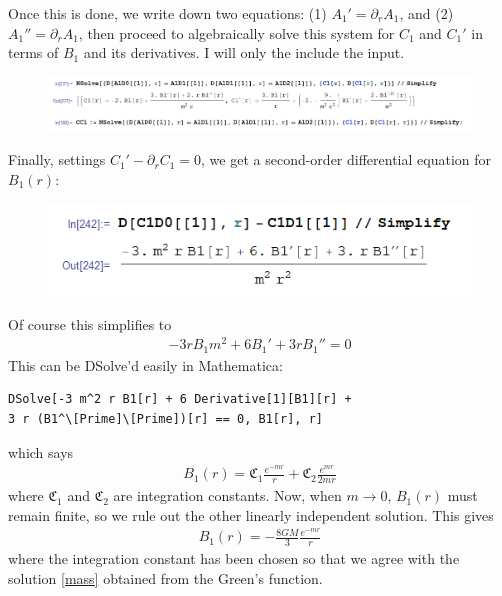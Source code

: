 \documentclass{book}
\theoremstyle{definition}
\newcommand{\p}{\partial}
\newcommand{\f}[2]{\frac{#1}{#2}}
\begin{document}
Once this is done, we write down two equations: (1) $A_1' = \p_r A_1$, and (2) $A_1''=\p_r A_1$, then proceed to algebraically solve this system for $C_1$ and $C_1'$ in terms of $B_1$ and its derivatives. I will only the include the input.
\begin{figure}[!htb]
	\centering
	\includegraphics[scale=0.4]{CC}
\end{figure}
Finally, settings $C_1' - \p_r C_1 = 0$, we get a second-order differential equation for $B_1(r)$:
\begin{figure}[!htb]
	\centering
	\includegraphics[scale=0.4]{BB}
\end{figure}
Of course this simplifies to 
\begin{align}
\boxed{-3rB_1m^2 + 6B_1' + 3rB_1'' = 0}
\end{align}
This can be DSolve'd easily in Mathematica:
\begin{lstlisting}
DSolve[-3 m^2 r B1[r] + 6 Derivative[1][B1][r] + 
3 r (B1^\[Prime]\[Prime])[r] == 0, B1[r], r]
\end{lstlisting}
which says
\begin{align}
B_1(r) = \mathfrak{C_1}\f{e^{-mr}}{r} + \mathfrak{C_2}\f{e^{mr}}{2mr}
\end{align}
where $\mathfrak{C_1}$ and $\mathfrak{C_2}$ are integration constants. Now, when $m\to 0$, $B_1(r)$ must remain finite, so we rule out the other linearly independent solution. This gives 
\begin{align}
{B_1(r) = -\f{8GM}{3}\f{e^{-mr}}{r}}
\end{align}
where the integration constant has been chosen so that we agree with the solution \eqref{mass} obtained from the Green's function. \\
\end{document}
